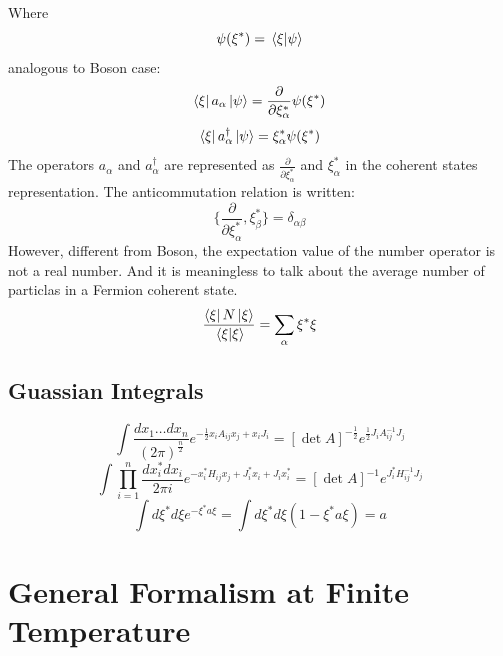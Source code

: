 \documentclass[12pt]{article}
\begin{document}
Where
\begin{equation*}
    \psi(\xi^*)=\braket*{\xi}{\psi}
\end{equation*}
analogous to Boson case:
\begin{equation*}
    \bra{\xi}a_\alpha\ket{\psi}=\frac{\partial}{\partial\xi^*_\alpha}\psi(\xi^*)
\end{equation*}
\begin{equation*}
    \bra{\xi}a^\dagger_\alpha\ket{\psi}=\xi^*_\alpha\psi(\xi^*)
\end{equation*}
The operators $a_\alpha$ and $a_\alpha^\dagger$ are represented as 
$\frac{\partial}{\partial\xi^*_\alpha}$ and $\xi^*_\alpha$ in the coherent states 
representation. The anticommutation relation is written:
\begin{equation*}
    \Big\{\frac{\partial}{\partial\xi^*_\alpha},\xi^*_\beta\Big\}=\delta_{\alpha\beta}
\end{equation*}
However, different from Boson, the expectation value of the number operator is not a 
real number. And it is meaningless to talk about the average number of particlas in a 
Fermion coherent state.
\begin{equation*}
    \frac{\bra{\xi}N\ket{\xi}}{\braket*{\xi}{\xi}}=\sum_\alpha\xi^*\xi
\end{equation*}
\subsection*{Guassian Integrals}
\begin{equation*}
    \int \frac{dx_1\dots dx_n}{(2\pi)^{\frac{n}{2}}}e^{-\frac{1}{2}x_iA_{ij}x_j+x_iJ_i}
    =[\det A]^{-\frac{1}{2}}e^{\frac{1}{2}J_iA^{-1}_{ij}J_j}
\end{equation*}
\begin{equation*}
    \int \prod_{i=1}^n\frac{dx_i^*dx_i}{2\pi i}e^{-x_i^*H_{ij}x_j+J_i^*x_i+J_ix_i^*}
    =[\det A]^{-1}e^{J_i^*H^{-1}_{ij}J_j}
\end{equation*}
\begin{equation*}
    \int d\xi^*d\xi e^{-\xi^*a\xi}=\int d\xi^*d\xi(1-\xi^*a\xi)=a
\end{equation*}
\section{General Formalism at Finite Temperature}
\end{document}
